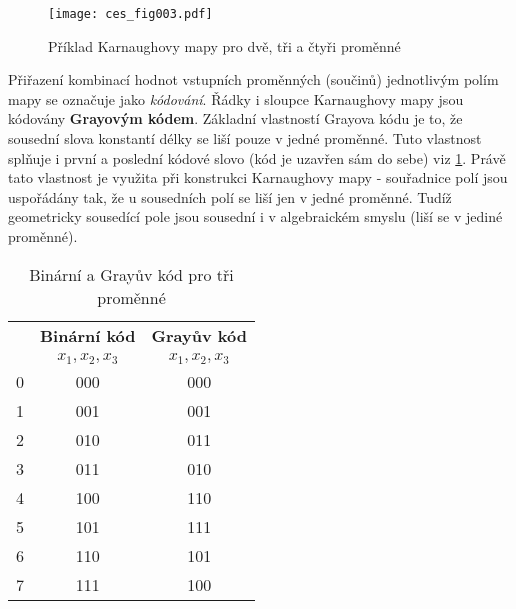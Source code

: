       \begin{figure}[ht!] %
        \centering
        \texttt{[image: ces\_fig003.pdf]}
        \caption{Příklad Karnaughovy mapy pro dvě, tři a čtyři proměnné}
        \label{ces:fig003}
      \end{figure}
      
      Přiřazení kombinací hodnot vstupních proměnných (součinů) jednotlivým polím mapy se označuje 
      jako \emph{kódování}. Řádky i sloupce Karnaughovy mapy jsou kódovány \textbf{Grayovým kódem}. 
      Základní vlastností Grayova kódu je to, že sousední slova konstantí délky se liší pouze v 
      jedné proměnné. Tuto vlastnost splňuje i první a poslední kódové slovo (kód je uzavřen sám
      do sebe) viz \ref{CES:BCD_Gray_c}. Právě tato vlastnost je využita při konstrukci Karnaughovy 
      mapy - souřadnice polí jsou uspořádány tak, že u sousedních polí se liší jen v jedné 
      proměnné. Tudíž geometricky sousedící pole jsou sousední i v algebraickém smyslu (liší se v 
      jediné proměnné).  
      
     \begin{table}[ht!] 
       \centering 
       \begin{tabular}{|c|c|c|}
         \hline
         \rowcolor{CornflowerBlue}{\textbf{Číslo}}  & \textbf{Binární kód} & \textbf{Grayův kód} \\
         \rowcolor{CornflowerBlue}{ }               &     {$x_1,x_2,x_3$}  & {$x_1,x_2,x_3$}     \\
          \hline\hline  
             \cellcolor[gray]{0.9}0                 & 000                  & 000               \\
          \hline       
             \cellcolor[gray]{0.9}1                 & 001                  & 001               \\
          \hline  
             \cellcolor[gray]{0.9}2                 & 010                  & 011               \\
          \hline  
             \cellcolor[gray]{0.9}3                 & 011                  & 010               \\
          \hline  
             \cellcolor[gray]{0.9}4                 & 100                  & 110               \\
          \hline         
             \cellcolor[gray]{0.9}5                 & 101                  & 111               \\
          \hline  
             \cellcolor[gray]{0.9}6                 & 110                  & 101               \\
          \hline  
             \cellcolor[gray]{0.9}7                 & 111                  & 100               \\
          \hline
       \end{tabular}
       \caption{Binární a Grayův kód pro tři proměnné}
       \label{CES:BCD_Gray_c}
     \end{table}
      
